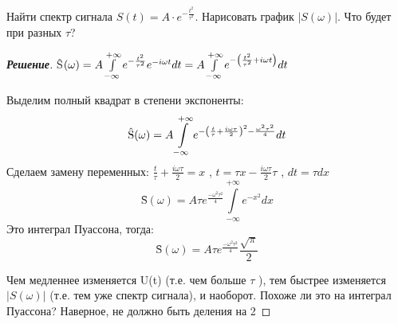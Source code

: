 \begin{task}
	Найти спектр сигнала $S(t)=A\cdot e^{-\frac{t^2}{\tau^2}}$. Нарисовать график $|S(\omega)|$. Что будет при разных $\tau$?
\end{task}
\begin{proof}[\rm{\textbf{Решение}}]
	\^S$(\omega)=A\int\limits_{-\infty}^{+\infty}e^{-\frac{t^2}{\tau^2}}e^{-i\omega t}dt=A\int\limits_{-\infty}^{+\infty}e^{-\qty(\frac{t^2}{\tau^2}+i\omega t)}dt$

	Выделим полный квадрат в степени экспоненты:
	\begin{equation}
		\text{\^S}(\omega) = A\int\limits_{-\infty}^{+\infty}e^{-\qty(\frac{t}{\tau}+\frac{i\omega \tau}{2})^2-\frac{\omega^2 \tau^2}{4}}dt
	\end{equation}
	Сделаем замену переменных: $\frac{t}{\tau}+\frac{i\omega \tau}{2} = x$ , $t=\tau x-\frac{i\omega \tau}{2}\tau$ , $dt=\tau dx$
	\begin{equation}
		\text{\^S}(\omega)=A\tau e^{\frac{-\omega^2 \tau^2}{4}} \int\limits_{-\infty}^{+\infty}e^{-x^2}dx
	\end{equation}
	Это интеграл Пуассона, тогда: 
	\begin{equation}
		\text{\^S}(\omega)=A\tau e^{\frac{-\omega^2 \tau^2}{4}} \frac{\sqrt{\pi}}{2}
	\end{equation}

	Чем медленнее изменяется U(t) (т.е. чем больше $\tau$ ), тем быстрее изменяется $|S(\omega)|$ (т.е. тем уже спектр сигнала), и наоборот.
	Похоже ли это на интеграл Пуассона? Наверное, не должно быть деления на 2
\end{proof}